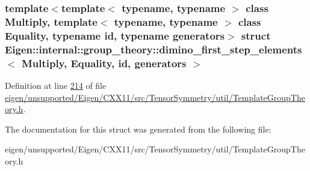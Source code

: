 \subsubsection*{template$<$template$<$ typename, typename $>$ class Multiply, template$<$ typename, typename $>$ class Equality, typename id, typename generators$>$\newline
struct Eigen\+::internal\+::group\+\_\+theory\+::dimino\+\_\+first\+\_\+step\+\_\+elements$<$ Multiply, Equality, id, generators $>$}



Definition at line \hyperlink{eigen_2unsupported_2_eigen_2_c_x_x11_2src_2_tensor_symmetry_2util_2_template_group_theory_8h_source_l00214}{214} of file \hyperlink{eigen_2unsupported_2_eigen_2_c_x_x11_2src_2_tensor_symmetry_2util_2_template_group_theory_8h_source}{eigen/unsupported/\+Eigen/\+C\+X\+X11/src/\+Tensor\+Symmetry/util/\+Template\+Group\+Theory.\+h}.



The documentation for this struct was generated from the following file\+:\begin{DoxyCompactItemize}
\item 
eigen/unsupported/\+Eigen/\+C\+X\+X11/src/\+Tensor\+Symmetry/util/\+Template\+Group\+Theory.\+h\end{DoxyCompactItemize}
